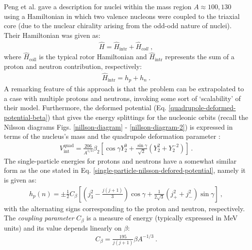 Peng et al. \cite{peng2003description} gave a description for nuclei within the mass region $A\approx 100,130$ using a Hamiltonian in which two valence nucleons were coupled to the triaxial core (due to the nuclear chirality arising from the odd-odd nature of nuclei). Their Hamiltonian was given as:
\begin{align}
    \hat{H}=\hat{H}_\text{intr}+\hat{H}_{coll}\ ,
\end{align}
where $\hat{H}_\text{coll}$ is the typical rotor Hamiltonian and $\hat{H}_\text{intr}$ represents the sum of a proton and neutron contribution, respectively:
\begin{align}
    \hat{H}_\text{intr}=h_p+h_n\ .
\end{align}
A remarking feature of this approach is that the problem can be extrapolated to a case with multiple protons and neutrons, invoking some sort of `scalability' of their model. Furthermore, the deformed potential (Eq. \ref{quadrupole-deformed-potential-beta}) that gives the energy splittings for the nucleonic orbits (recall the Nilsson diagrams Figs. \ref{nillson-diagram} - \ref{nillson-diagram-2}) is expressed in terms of the nucleus's mass and the quadrupole deformation parameter \cite{peng2003description}:
\begin{align}
    V_\text{int}^\text{quad}=\frac{206}{A^{1/3}}\beta_2\left[\cos\gamma Y_2^0+\frac{\sin\gamma}{\sqrt{2}}(Y_2^2+Y_2^{-2})\right]\ .
    \label{quadrupole-deformed-potential-V}
\end{align}
The single-particle energies for protons and neutrons have a somewhat similar form as the one stated in Eq. \ref{single-particle-nilsson-defored-potential}, namely it is given as:
\begin{align}
    h_p(n)=\pm\frac{1}{2}C_\beta\left[\left(j_3^2-\frac{j(j+1)}{3}\right)\cos\gamma+\frac{1}{2\sqrt{3}}(j_+^2+j_-^2)\sin\gamma\right]\ ,
\end{align}
with the alternating signs corresponding to the proton and neutron, respectively. The \emph{coupling parameter} $C_\beta$ is a measure of energy (typically expressed in MeV units) and its value depends linearly on $\beta$:
\begin{align}
    C_\beta=\frac{195}{j(j+1)}\beta A^{-1/3}\ .
\end{align}
